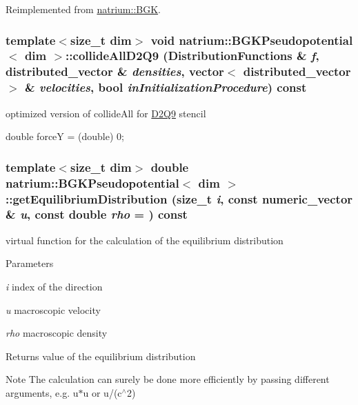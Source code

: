 Reimplemented from \hyperlink{classnatrium_1_1BGK_a9fa1c980217a183fc4762954e86ba36d}{natrium::BGK}.\hypertarget{classnatrium_1_1BGKPseudopotential_acf03df141262b39a778e327bf0c25c2a}{
\subsubsection[{collideAllD2Q9}]{\setlength{\rightskip}{0pt plus 5cm}template$<$size\_\-t dim$>$ void {\bf natrium::BGKPseudopotential}$<$ dim $>$::collideAllD2Q9 ({\bf DistributionFunctions} \& {\em f}, \/  {\bf distributed\_\-vector} \& {\em densities}, \/  vector$<$ {\bf distributed\_\-vector} $>$ \& {\em velocities}, \/  bool {\em inInitializationProcedure}) const}}
\label{classnatrium_1_1BGKPseudopotential_acf03df141262b39a778e327bf0c25c2a}


optimized version of collideAll for \hyperlink{classnatrium_1_1D2Q9}{D2Q9} stencil 

double forceY = (double) 0; \hypertarget{classnatrium_1_1BGKPseudopotential_a366ccd417ca4ad5fa37ce0572e0d6fe4}{
\subsubsection[{getEquilibriumDistribution}]{\setlength{\rightskip}{0pt plus 5cm}template$<$size\_\-t dim$>$ double {\bf natrium::BGKPseudopotential}$<$ dim $>$::getEquilibriumDistribution (size\_\-t {\em i}, \/  const {\bf numeric\_\-vector} \& {\em u}, \/  const double {\em rho} = {}) const}}
\label{classnatrium_1_1BGKPseudopotential_a366ccd417ca4ad5fa37ce0572e0d6fe4}


virtual function for the calculation of the equilibrium distribution 
\begin{DoxyParams}{Parameters}
\item[{\em i}]index of the direction \item[{\em u}]macroscopic velocity \item[{\em rho}]macroscopic density \end{DoxyParams}
\begin{DoxyReturn}{Returns}
value of the equilibrium distribution 
\end{DoxyReturn}
\begin{DoxyNote}{Note}
The calculation can surely be done more efficiently by passing different arguments, e.g. u$\ast$u or u/(c$^\wedge$2) 
\end{DoxyNote}


